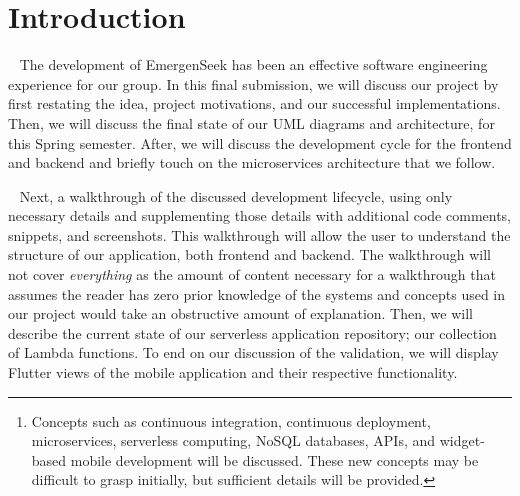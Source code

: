 \documentclass[10pt, a4paper]{article}
\begin{document}
\vspace*{\fill}
\begin{abstract}
In this final report, we describe and detail the validation of EmergenSeek, a multiuse, cross-platform mobile application providing simple access to emergency services and contact connections. As with previous reports, we will structure the report by enumerating on the frontend and backend. Dissimilarly, we will only describe necessary details in the validation of our implementations, to the extent that, any other developer with some programming background will be able to successfully implement our system's components. Only necessary details will be presented to the reader and care should be taken when reading them\footnote{Concepts such as continuous integration, continuous deployment, microservices, serverless computing, NoSQL databases, APIs, and widget-based mobile development will be discussed. These new concepts may be difficult to grasp initially, but sufficient details will be provided.}. Restatements from previous deliverable reports will be made to remind the reader of pre-defined, but important information. Also, a glossary is provided at the end of the report to define terms and jargon that may be confusing or unfamiliar for the reader. \\
\textit{Keywords:} API Gateway, CI/CD, Cloud, Dart, Flutter, Golang, Lambda, Mobile, Serverless
\end{abstract}
\vspace*{\fill}
\newpage

\tableofcontents
\newpage


\section{Introduction}
\par ~ The development of EmergenSeek has been an effective software engineering experience for our group. In this final submission, we will discuss our project by first restating the idea, project motivations, and our successful implementations. Then, we will discuss the final state of our UML diagrams and architecture, for this Spring semester. After, we will discuss the development cycle for the frontend and backend and briefly touch on the microservices architecture that we follow. 

\par ~ Next, a walkthrough of the discussed development lifecycle, using only necessary details and supplementing those details with additional code comments, snippets, and screenshots. This walkthrough will allow the user to understand the structure of our application, both frontend and backend. The walkthrough will not cover \emph{everything} as the amount of content necessary for a walkthrough that assumes the reader has zero prior knowledge of the systems and concepts used in our project would take an obstructive amount of explanation. Then, we will describe the current state of our serverless application repository; our collection of Lambda functions. To end on our discussion of the validation, we will display Flutter views of the mobile application and their respective functionality. 
\end{document}
